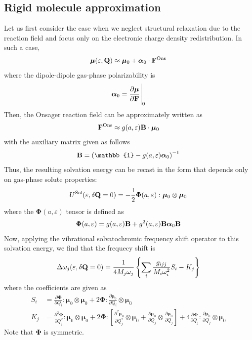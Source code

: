 \documentclass[a4paper,titlepage,twoside,fleqn,12pt]{book}
\newcommand{\BM}[1]{\bm{#1}}
\newcommand{\fderiv}[2]{\ensuremath{
\frac{\partial #1}{\partial #2}}}
\newcommand{\sderiv}[2]{\ensuremath{
\frac{\partial^2 #1}{\partial #2^2}
}}
\begin{document}
\begin{refsection}
\subsection{Rigid molecule approximation}

Let us first consider the case when we neglect structural
relaxation due to the reaction field and focus only
on the electronic charge density redistribution. In such a case,
%
\begin{equation}
 {\BM \mu}(\varepsilon, {\bf Q}) \approx 
 {\BM \mu}_0 + {\BM \alpha}_0  \cdot {\bf F}^{\rm Ons}
\end{equation}
%
where the dipole\hyp{}dipole gas\hyp{}phase polarizability is
%
\begin{equation}
{\BM \alpha}_0  = \fderiv{{\BM \mu}}{\bf F}\Bigg|_{0}
\end{equation}
%
Then, the Onsager reaction field can be approximately written as
%
\begin{equation}
{\bf F}^{\rm Ons} \approx g(a,\varepsilon) {\bf B} \cdot {\BM \mu}_0
\end{equation}
%
with the auxiliary matrix given as follows
%
\begin{equation}
{\bf B} = \left( \mathbb{1} - g(a,\varepsilon){\BM \alpha}_0 \right)^{-1}
\end{equation}
%
Thus, the resulting solvation energy can be recast in the form
that depends only on gas\hyp{}phase solute properties:
%
\begin{equation} \label{e:ons-e-sol-init}
U^{\rm Sol}(\varepsilon, \delta{\bf Q}=0) = -\frac{1}{2} {\BM \Phi}(a, \varepsilon) : {\BM \mu}_0 \otimes {\BM \mu}_0
\end{equation}
%
where the ${\BM \Phi}(a, \varepsilon)$ tensor is defined as
%
\begin{equation}
{\BM \Phi}(a, \varepsilon) = g(a,\varepsilon) {\bf B} + g^2(a,\varepsilon) {\bf B} {\BM \alpha}_0 {\bf B}
\end{equation}
%
Now, applying the vibrational solvatochromic frequency shift
operator to this solvation energy,
we find that the frequecy shift is
%
\begin{equation} \label{e:dw-ons-working-form}
\Delta\omega_j(\varepsilon, \delta{\bf Q}=0) = \frac{1}{4M_j\omega_j}
\left\{ \sum_i \frac{g_{ijj}}{M_i\omega_i^2}S_i - K_j \right\}
\end{equation}
%
where the coefficients are given as
%
\begin{subequations}
 \begin{align}
  S_i &= \fderiv{{\BM \Phi}}{Q_i} : {\BM \mu}_0 \otimes {\BM \mu}_0 
           + 2{\BM \Phi} : \fderiv{{\BM \mu}_0}{Q_i} \otimes {\BM \mu}_0 \label{e:ons-si-init}\\
  K_j &= \sderiv{{\BM \Phi}}{Q_j} : {\BM \mu}_0 \otimes {\BM \mu}_0
           + 2{\BM \Phi} : \left[ \sderiv{{\BM \mu}_0}{Q_j} \otimes {\BM \mu}_0 
           +  \fderiv{{\BM \mu}_0}{Q_j} \otimes \fderiv{{\BM \mu}_0}{Q_j} \right] 
           + 4\fderiv{{\BM \Phi}}{Q_j} : \fderiv{{\BM \mu}_0}{Q_j} \otimes {\BM \mu}_0  \label{e:ons-ki-init}
 \end{align}
\end{subequations}
%
Note that ${\BM \Phi}$ is symmetric.  


\end{refsection}
\end{document}
